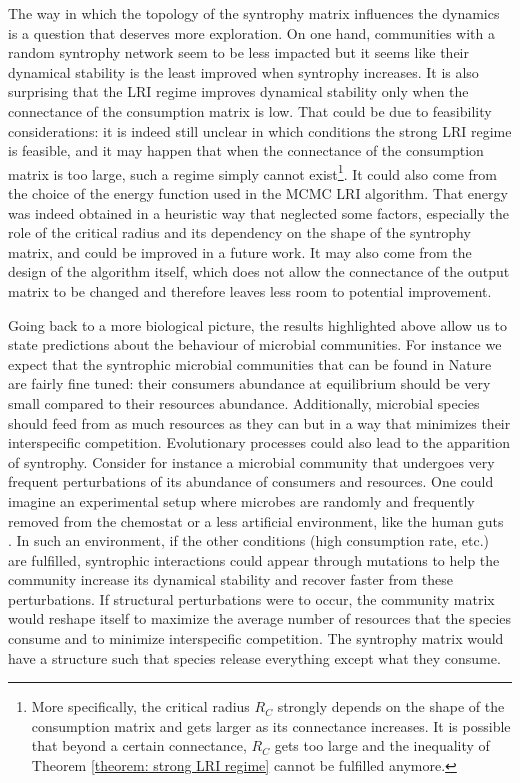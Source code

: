 \documentclass[12pt, titlepage]{report}
\begin{document}
The way in which the topology of the syntrophy matrix influences the dynamics is a question that deserves more exploration. On one hand, communities with a random syntrophy network seem to be less impacted but it seems like their dynamical stability is the least improved when syntrophy increases. It is also surprising that the LRI regime improves dynamical stability only when the connectance of the consumption matrix is low. That could be due to feasibility considerations: it is indeed still unclear in which conditions the strong LRI regime is feasible, and it may happen that when the connectance of the consumption matrix is too large, such a regime simply cannot exist\footnote{More specifically, the critical radius $R_C$ strongly depends on the shape of the consumption matrix and gets larger as its connectance increases. It is possible that beyond a certain connectance, $R_C$ gets too large and the inequality of Theorem \ref{theorem: strong LRI regime} cannot be fulfilled anymore.}. It could also come from the choice of the energy function used in the MCMC LRI algorithm. That energy was indeed obtained in a heuristic way that neglected some factors, especially the role of the critical radius and its dependency on the shape of the syntrophy matrix, and could be improved in a future work. It may also come from the design of the algorithm itself, which does not allow the connectance of the output matrix to be changed and therefore leaves less room to potential improvement.


Going back to a more biological picture, the results highlighted above allow us to state predictions about the behaviour of microbial communities. For instance we expect that the syntrophic microbial communities that can be found in Nature are fairly fine tuned: their consumers abundance at equilibrium should be very small compared to their resources abundance. Additionally, microbial species should feed from as much resources as they can but in a way that minimizes their interspecific competition. Evolutionary processes could also lead to the apparition of syntrophy. Consider for instance a microbial community that undergoes very frequent perturbations of its abundance of consumers and resources. One could imagine an experimental setup where microbes are randomly and frequently removed from the chemostat or a less artificial environment, like the human guts \cite{stein_ecological_2013}. In such an environment, if the other conditions (high consumption rate, etc.) are fulfilled, syntrophic interactions could appear through mutations to help the community increase its dynamical stability and recover faster from these perturbations. If structural perturbations were to occur, the community matrix would reshape itself to maximize the average number of resources that the species consume and to minimize interspecific competition. The syntrophy matrix would have a structure such that species release everything except what they consume.
\end{document}
